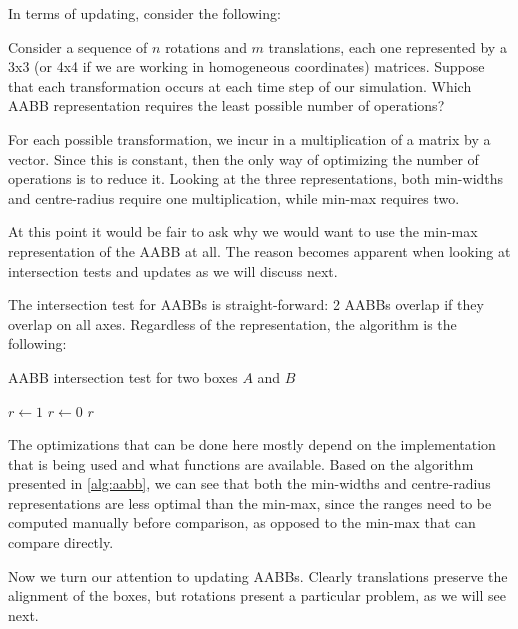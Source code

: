    In terms of updating, consider the following:
    \begin{exmp}
      Consider a sequence of $n$ rotations and $m$ translations, each one
      represented by a 3x3 (or 4x4 if we are working in homogeneous coordinates)
      matrices. Suppose that each transformation occurs at each time step of our
      simulation. Which AABB representation requires the least possible number
      of operations?
    \end{exmp}

    For each possible transformation, we incur in a multiplication of a matrix
    by a vector. Since this is constant, then the only way of optimizing the
    number of operations is to reduce it. Looking at the three representations,
    both min-widths and centre-radius require one multiplication, while min-max
    requires two. 

    At this point it would be fair to ask why we would want to use the min-max
    representation of the AABB at all. The reason becomes apparent when looking
    at intersection tests and updates as we will discuss next.

    The intersection test for AABBs is straight-forward: 2 AABBs overlap if they
    overlap on all axes. Regardless of the representation, the algorithm is the
    following:
    \begin{algorithm}
      \caption{AABB intersection test for two boxes $A$ and $B$}
      \label{alg:aabb}
      \begin{algorithmic}
        \State $r \gets 1$
            \State $r \gets 0$
          \EndIf
        \EndFor
        \State \Return $r$
      \end{algorithmic}
    \end{algorithm}

    The optimizations that can be done here mostly depend on the implementation
    that is being used and what functions are available. Based on the algorithm
    presented in \ref{alg:aabb}, we can see that both the min-widths and
    centre-radius representations are less optimal than the min-max, since the
    ranges need to be computed manually before comparison, as opposed to the
    min-max that can compare directly. 

    Now we turn our attention to updating AABBs. Clearly translations preserve
    the alignment of the boxes, but rotations present a particular problem, as
    we will see next.

